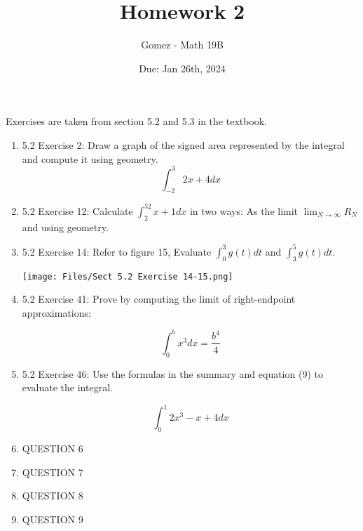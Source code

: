 \documentclass[11pt]{article}
\title{Homework 2}
\author{Gomez - Math 19B}
\date{Due: Jan 26th, 2024}
\begin{document}
\maketitle

\noindent 
\normalsize

Exercises are taken from section 5.2 and 5.3 in the textbook.


\begin{enumerate}

\item 
5.2 Exercise 2: Draw a graph of the signed area represented by the integral and compute it using geometry. 
\[
\int_{-2}^{3} 2x + 4 dx
\]

\item 
5.2 Exercise 12: Calculate $\int_2^52x+1 dx$ in two ways: As the limit $\lim_{N\to\infty} R_N$ and using geometry.

\item 
5.2 Exercise 14: Refer to figure 15, Evaluate $\int_0^3 g(t) dt$ and $\int_3^5 g(t) dt$. 

\begin{center}
    \texttt{[image: Files/Sect 5.2 Exercise 14-15.png]}
\end{center}

\item 
5.2 Exercise 41: Prove by computing the limit of right-endpoint approximations:

\[
\int_0^b x^3 dx = \frac{b^4}{4}
\]

\item 
5.2 Exercise 46: Use the formulas in the summary and equation (9) to evaluate the integral. 

\[
\int_0^1 2x^3 - x + 4 dx
\]
\item 
QUESTION 6
\item 
QUESTION 7
\item 
QUESTION 8
\item 
QUESTION 9


\end{enumerate}
%

%
\end{document}
